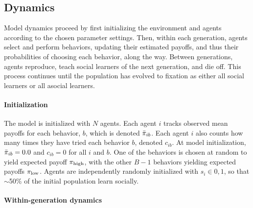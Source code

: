 \documentclass[letterpaper,11.5pt]{scrartcl}
\begin{document}
\subsection{Dynamics}

Model dynamics proceed by first initializing the environment and agents according
to the chosen parameter settings. %
Then, within each generation, agents select and perform behaviors, updating their estimated payoffs, and thus their probabilities of choosing each behavior, along the way.
Between generations, agents reproduce, teach social learners of the next generation, and die off. 
This process continues until the population has evolved to fixation as either all social learners or
all asocial learners. %


\paragraph{Initialization}

The model is initialized with $N$ agents. Each agent $i$ tracks 
observed mean payoffs for each behavior, $b$, which is denoted $\bar\pi_{ib}$. Each
agent $i$ also counts how many times they have tried each behavior $b$, 
denoted $c_{ib}$. At model initialization, $\bar\pi_{ib} = 0.0$ and $c_{ib} = 0$ for
all $i$ and $b$.%
One of the behaviors is chosen at random to yield expected payoff $\pi_{\mathrm{high}}$, with the other $B-1$ behaviors yielding
expected payoffs $\pi_{\mathrm{low}}$. Agents are independently randomly initialized with $s_i
\in 0,1$, so that $\sim$50\% of the initial population learn socially.


\paragraph{Within-generation dynamics}
\end{document}
